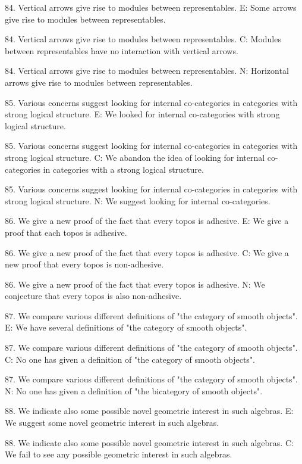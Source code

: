 84. Vertical arrows give rise to modules between representables.
E: Some arrows give rise to modules between representables.

84. Vertical arrows give rise to modules between representables.
C: Modules between representables have no interaction with vertical arrows.

84. Vertical arrows give rise to modules between representables.
N: Horizontal arrows give rise to modules between representables.

85. Various concerns suggest looking for internal co-categories in categories with strong logical structure.
E: We looked for internal co-categories with strong logical structure.

85. Various concerns suggest looking for internal co-categories in categories with strong logical structure.
C: We abandon the idea of looking for internal co-categories in categories with a strong logical structure.

85. Various concerns suggest looking for internal co-categories in categories with strong logical structure.
N: We suggest looking for internal co-categories.

86. We give a new proof of the fact that every topos is adhesive.
E: We give a proof that each topos is adhesive.

86. We give a new proof of the fact that every topos is adhesive.
C: We give a new proof that every topos is non-adhesive.

86. We give a new proof of the fact that every topos is adhesive.
N: We conjecture that every topos is  also non-adhesive.

87. We compare various different definitions of "the category of smooth objects".
E: We have several definitions of "the category of smooth objects".

87. We compare various different definitions of "the category of smooth objects".
C: No one has given a definition of "the category of smooth objects".

87. We compare various different definitions of "the category of smooth objects".
N: No one has given a definition of "the bicategory of smooth objects".

88. We indicate also some possible novel geometric interest in such algebras.
E: We suggest some novel geometric interest in such algebras.

88. We indicate also some possible novel geometric interest in such algebras.
C: We fail to see any possible geometric interest in such algebras.

